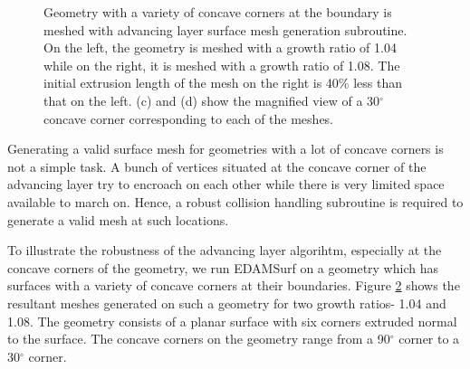 \begin{figure}
\begin{subfigure}{0.4\textwidth}
		\caption{}
		\label{fig-variousAngle-corner-high}
	\end{subfigure}
	\caption{Geometry with a variety of concave corners at the boundary is meshed with advancing layer surface mesh generation subroutine. On the left, the geometry is meshed with a growth ratio of 1.04 while on the right, it is meshed with a growth ratio of 1.08. The initial extrusion length of the mesh on the right is 40\% less than that on the left. (c) and (d) show the magnified view of a 30$^\circ$ concave corner corresponding to each of the meshes.}
	\label{fig-variousAngle}
\end{figure}

Generating a valid surface mesh for geometries with a lot of concave corners is not a simple task. A bunch of vertices situated at the concave corner of the advancing layer try to encroach on each other while there is very limited space available to march on. Hence, a robust collision handling subroutine is required to generate a valid mesh at such locations.

To illustrate the robustness of the advancing layer algorihtm, especially at the concave corners of the geometry, we run EDAMSurf on a geometry which has surfaces with a variety of concave corners at their boundaries. Figure \ref{fig-variousAngle} shows the resultant meshes generated on such a geometry for two growth ratios- 1.04 and 1.08. The geometry consists of a planar surface with six corners extruded normal to the surface. The concave corners on the geometry range from a 90$^\circ$ corner to a 30$^\circ$ corner.

